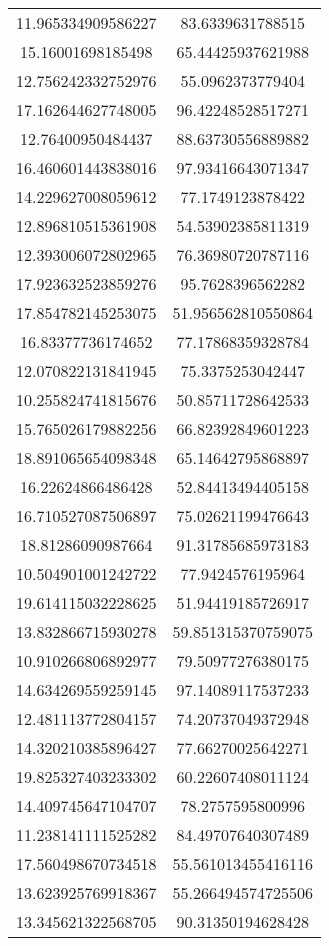 \begin{table}
\begin{tabular}{cc}
11.965334909586227 & 83.6339631788515 \\
15.16001698185498 & 65.44425937621988 \\
12.756242332752976 & 55.0962373779404 \\
17.162644627748005 & 96.42248528517271 \\
12.76400950484437 & 88.63730556889882 \\
16.460601443838016 & 97.93416643071347 \\
14.229627008059612 & 77.1749123878422 \\
12.896810515361908 & 54.53902385811319 \\
12.393006072802965 & 76.36980720787116 \\
17.923632523859276 & 95.7628396562282 \\
17.854782145253075 & 51.956562810550864 \\
16.83377736174652 & 77.17868359328784 \\
12.070822131841945 & 75.3375253042447 \\
10.255824741815676 & 50.85711728642533 \\
15.765026179882256 & 66.82392849601223 \\
18.891065654098348 & 65.14642795868897 \\
16.22624866486428 & 52.84413494405158 \\
16.710527087506897 & 75.02621199476643 \\
18.81286090987664 & 91.31785685973183 \\
10.504901001242722 & 77.9424576195964 \\
19.614115032228625 & 51.94419185726917 \\
13.832866715930278 & 59.851315370759075 \\
10.910266806892977 & 79.50977276380175 \\
14.634269559259145 & 97.14089117537233 \\
12.481113772804157 & 74.20737049372948 \\
14.320210385896427 & 77.66270025642271 \\
19.825327403233302 & 60.22607408011124 \\
14.409745647104707 & 78.2757595800996 \\
11.238141111525282 & 84.49707640307489 \\
17.560498670734518 & 55.561013455416116 \\
13.623925769918367 & 55.266494574725506 \\
13.345621322568705 & 90.31350194628428 \\

\end{tabular}
\end{table}
